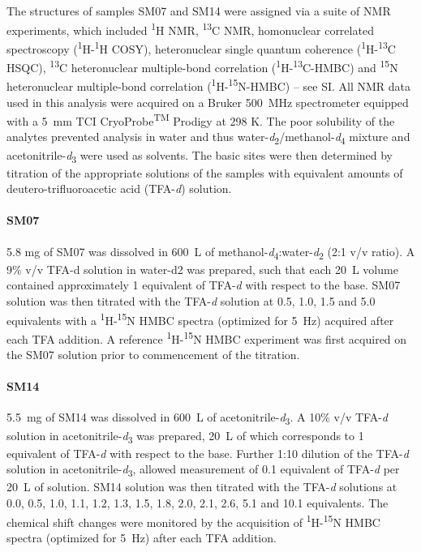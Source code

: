 \documentclass[9pt,lineno]{elife}
\begin{document}
The structures of samples SM07 and SM14 were assigned via a suite of NMR experiments, which included \textsuperscript{1}H NMR, \textsuperscript{13}C NMR, homonuclear correlated spectroscopy (\textsuperscript{1}H-\textsuperscript{1}H COSY), heteronuclear single quantum coherence (\textsuperscript{1}H-\textsuperscript{13}C HSQC), \textsuperscript{13}C heteronuclear multiple-bond correlation (\textsuperscript{1}H-\textsuperscript{13}C-HMBC) and \textsuperscript{15}N heteronuclear multiple-bond correlation (\textsuperscript{1}H-\textsuperscript{15}N-HMBC) – see SI. All NMR data used in this analysis were acquired on a Bruker 500~MHz spectrometer equipped with a 5~mm TCI CryoProbe\textsuperscript{TM} Prodigy at 298 K. The poor solubility of the analytes prevented analysis in water and thus water-\textit{d}\textsubscript{2}/methanol-\textit{d}\textsubscript{4} mixture and acetonitrile-\textit{d}\textsubscript{3} were used as solvents. The basic sites were then determined by titration of the appropriate solutions of the samples with equivalent amounts of deutero-trifluoroacetic acid (TFA-\textit{d}) solution.

\paragraph{SM07}
5.8 mg of SM07 was dissolved in 600~\micro L of methanol-\textit{d}\textsubscript{4}:water-\textit{d}\textsubscript{2} (2:1 v/v ratio). 
A 9\% v/v TFA-d solution in water-d2 was prepared, such that each 20~\micro L volume contained approximately 1 equivalent of TFA-\textit{d} with respect to the base.  
SM07 solution was then titrated with the TFA-\textit{d} solution at 0.5, 1.0, 1.5 and 5.0 equivalents with a \textsuperscript{1}H-\textsuperscript{15}N HMBC spectra (optimized for 5~Hz) acquired after each TFA addition. 
A reference \textsuperscript{1}H-\textsuperscript{15}N HMBC experiment was first acquired on the SM07 solution prior to commencement of the titration.

\paragraph{SM14}
5.5~mg of SM14 was dissolved in 600~\micro L of acetonitrile-\textit{d}\textsubscript{3}. 
A 10\% v/v TFA-\textit{d} solution in acetonitrile-\textit{d}\textsubscript{3} was prepared, 20~\micro L of which corresponds to 1 equivalent of TFA-\textit{d} with respect to the base.
Further 1:10 dilution of the TFA-\textit{d} solution in acetonitrile-\textit{d}\textsubscript{3}, allowed measurement of 0.1 equivalent of TFA-\textit{d} per 20~\micro L of solution.  
SM14 solution was then titrated with the TFA-\textit{d} solutions at 0.0, 0.5, 1.0, 1.1, 1.2, 1.3, 1.5, 1.8, 2.0, 2.1, 2.6, 5.1 and 10.1 equivalents. 
The chemical shift changes were monitored by the acquisition of \textsuperscript{1}H-\textsuperscript{15}N HMBC spectra (optimized for 5~Hz) after each TFA addition.
\end{document}
